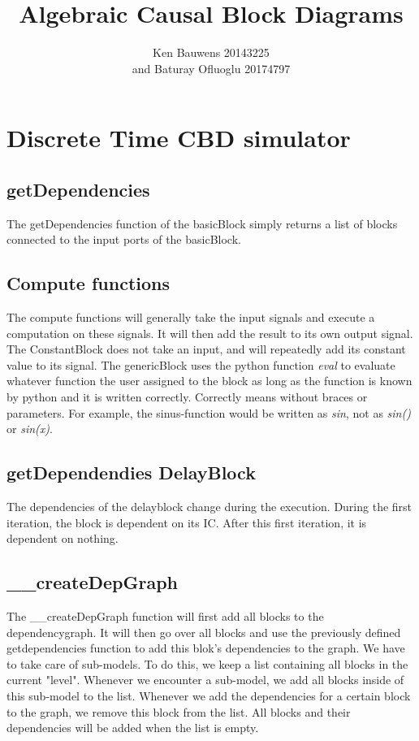 \documentclass{article}
\title{\vspace{60mm}\textbf{Algebraic Causal Block Diagrams}}
\author{Ken Bauwens 20143225\\and Baturay Ofluoglu 20174797\\}
\begin{document}
\maketitle
\pagebreak
\section{Discrete Time CBD simulator}
\subsection{getDependencies}
The getDependencies function of the basicBlock simply returns a list of blocks connected to the input ports of the basicBlock.
\subsection{Compute functions}
The compute functions will generally take the input signals and execute a computation on these signals. It will then add the result to its own output signal. The ConstantBlock does not take an input, and will repeatedly add its constant value to its signal. The genericBlock uses the python function \textit{eval} to evaluate whatever function the user assigned to the block as long as the function is known by python and it is written correctly. Correctly means without braces or parameters. For example, the sinus-function would be written as \textit{sin}, not as \textit{sin()} or \textit{sin(x)}.
\subsection{getDependendies DelayBlock}
The dependencies of the delayblock change during the execution. During the first iteration, the block is dependent on its IC. After this first iteration, it is dependent on nothing. 
\subsection{\_\_createDepGraph}
The \_\_createDepGraph function will first add all blocks to the dependencygraph. It will then go over all blocks and use the previously defined getdependencies function to add this blok's dependencies to the graph. We have to take care of sub-models. To do this, we keep a list containing all blocks in the current "level". Whenever we encounter a sub-model, we add all blocks inside of this sub-model to the list. Whenever we add the dependencies for a certain block to the graph, we remove this block from the list. All blocks and their dependencies will be added when the list is empty.
\end{document}
